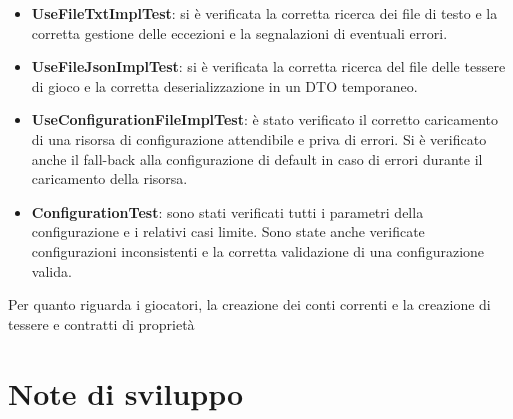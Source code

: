 \begin{itemize}
    \item \textbf{UseFileTxtImplTest}: si è verificata la corretta ricerca dei file di testo e la corretta gestione delle eccezioni e la segnalazioni di eventuali errori.
    \item \textbf{UseFileJsonImplTest}: si è verificata la corretta ricerca del file delle tessere di gioco e la corretta deserializzazione in un DTO temporaneo.
    \item \textbf{UseConfigurationFileImplTest}: è stato verificato il corretto caricamento di una risorsa di configurazione attendibile e priva di errori. Si è verificato anche il fall-back alla configurazione di default in caso di errori durante il caricamento della risorsa.
    \item \textbf{ConfigurationTest}: sono stati verificati tutti i parametri della configurazione e i relativi casi limite. Sono state anche verificate configurazioni inconsistenti e la corretta validazione di una configurazione valida.
\end{itemize}
Per quanto riguarda i giocatori, la creazione dei conti correnti e la creazione di tessere e contratti di proprietà
\section{Note di sviluppo}